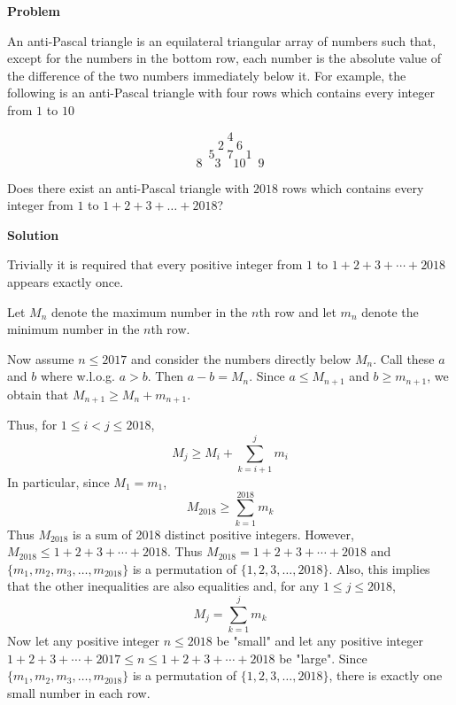 



\renewcommand{\theenumi}{\alph{enumi}}



\noindent
 
\filbreak

\begin{problem}
[IMO2018PL3]


\textbf{Problem}


An anti-Pascal triangle is an equilateral triangular array of numbers such that, except for the numbers in the bottom row, each number is the absolute value of the difference of the two numbers immediately below it. For example, the following is an anti-Pascal triangle with four rows which contains every integer from $1$ to $10$

\[4\]
\[2\quad 6\]
\[5\quad 7 \quad 1\]
\[8\quad 3 \quad 10 \quad 9\]

Does there exist an anti-Pascal triangle with $2018$ rows which contains every integer from $1$ to $1 + 2 + 3 + \dots + 2018$?

\textbf{Solution}

Trivially it is required that every positive integer from $1$ to $1+2+3+\cdots+2018$ appears exactly once.

Let $M_n$ denote the maximum number in the $n$th row and let $m_n$ denote the minimum number in the $n$th row.

Now assume $n\leq 2017$ and consider the numbers directly below $M_n$. Call these $a$ and $b$ where w.l.o.g. $a>b$. Then $a-b=M_n$. Since $a\leq M_{n+1}$ and $b\geq m_{n+1}$, we obtain that $M_{n+1}\geq M_n+m_{n+1}$.

Thus, for $1\leq i<j\leq 2018$,\[M_j\geq M_i+\sum_{k=i+1}^j m_i\]
In particular, since $M_1=m_1$,\[M_{2018}\geq \sum_{k=1}^{2018} m_k\]
Thus $M_{2018}$ is a sum of 2018 distinct positive integers. However, $M_{2018}\leq 1+2+3+\cdots+2018$. Thus $M_{2018}=1+2+3+\cdots+2018$ and $\{m_1,m_2,m_3,\dots,m_{2018}\}$ is a permutation of $\{1,2,3,\dots,2018\}$. Also, this implies that the other inequalities are also equalities and, for any $1\leq j\leq 2018$,\[M_j=\sum_{k=1}^j m_k\]
Now let any positive integer $n\leq 2018$ be "small" and let any positive integer $1+2+3+\cdots+2017\leq n\leq 1+2+3+\cdots+2018$ be "large". Since $\{m_1,m_2,m_3,\dots,m_{2018}\}$ is a permutation of $\{1,2,3,\dots,2018\}$, there is exactly one small number in each row.


\end{problem}
